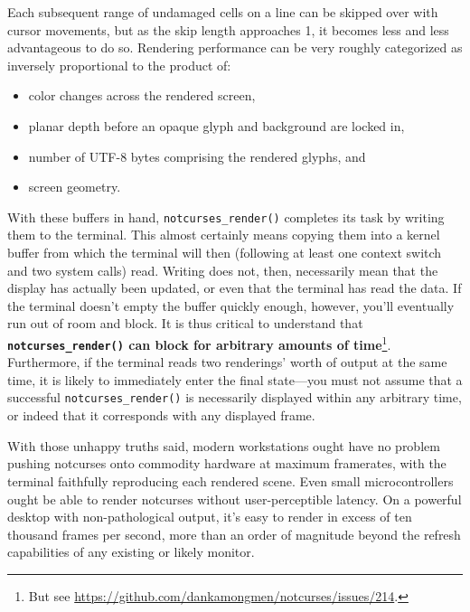\documentclass[letterpaper,10pt]{article}
\newenvironment{denseitemize}{
  \begin{itemize}
      \setlength{\itemsep}{0pt}
}{
  \end{itemize}
}
\begin{document}
Each subsequent range of undamaged cells on a line can be skipped over with
cursor movements, but as the skip length approaches 1, it becomes less and
less advantageous to do so. Rendering performance can be very roughly
categorized as inversely proportional to the product of:

\begin{denseitemize}
\item{color changes across the rendered screen,}
\item{planar depth before an opaque glyph and background are locked in,}
\item{number of UTF-8 bytes comprising the rendered glyphs, and}
\item{screen geometry.}
\end{denseitemize}

With these buffers in hand, \texttt{notcurses\_render()} completes its task by
writing them to the terminal. This almost certainly means copying
them into a kernel buffer from which the terminal will then (following at
least one context switch and two system calls) read. Writing does not,
then, necessarily mean that the display has actually been updated, or even
that the terminal has read the data. If the terminal doesn't empty the buffer
quickly enough, however, you'll eventually run out of room and block. It is
thus critical to understand that \textbf{\texttt{notcurses\_render()} can block
for arbitrary amounts of time}\footnote{But see
\url{https://github.com/dankamongmen/notcurses/issues/214}.}. Furthermore,
if the terminal reads two renderings' worth of output at the same time, it is
likely to immediately enter the final state---you must not assume that a successful
\texttt{notcurses\_render()} is necessarily displayed within any arbitrary time,
or indeed that it corresponds with any displayed frame.

With those unhappy truths said, modern workstations ought have no problem pushing
notcurses onto commodity hardware at maximum framerates, with the terminal
faithfully reproducing each rendered scene. Even small microcontrollers ought
be able to render notcurses without user-perceptible latency. On a powerful
desktop with non-pathological output, it's easy to render in excess of
ten thousand frames per second, more than an order of magnitude beyond the
refresh capabilities of any existing or likely monitor\cite{charni}.
\end{document}

